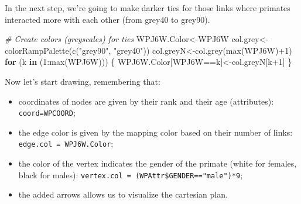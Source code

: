 \documentclass[
  notitlepage,
  onecolumn,
  openany]{book}
\newenvironment{Shaded}{\begin{snugshade}}{\end{snugshade}}
\newcommand{\CommentTok}[1]{\textcolor[rgb]{0.56,0.35,0.01}{\textit{#1}}}
\newcommand{\ControlFlowTok}[1]{\textcolor[rgb]{0.13,0.29,0.53}{\textbf{#1}}}
\newcommand{\DecValTok}[1]{\textcolor[rgb]{0.00,0.00,0.81}{#1}}
\newcommand{\FunctionTok}[1]{\textcolor[rgb]{0.00,0.00,0.00}{#1}}
\newcommand{\NormalTok}[1]{#1}
\newcommand{\OtherTok}[1]{\textcolor[rgb]{0.56,0.35,0.01}{#1}}
\newcommand{\SpecialCharTok}[1]{\textcolor[rgb]{0.00,0.00,0.00}{#1}}
\newcommand{\StringTok}[1]{\textcolor[rgb]{0.31,0.60,0.02}{#1}}
\providecommand{\tightlist}{%
  \setlength{\itemsep}{0pt}\setlength{\parskip}{0pt}}
\begin{document}
In the next step, we're going to make darker ties for those links where primates interacted more with each other (from grey40 to grey90).

\begin{Shaded}
\begin{Highlighting}[]
\CommentTok{\# Create colors (greyscales) for ties}
\NormalTok{WPJ6W.Color}\OtherTok{\textless{}{-}}\NormalTok{WPJ6W}
\NormalTok{col.grey}\OtherTok{\textless{}{-}}\FunctionTok{colorRampPalette}\NormalTok{(}\FunctionTok{c}\NormalTok{(}\StringTok{"grey90"}\NormalTok{, }\StringTok{"grey40"}\NormalTok{))}
\NormalTok{col.greyN}\OtherTok{\textless{}{-}}\FunctionTok{col.grey}\NormalTok{(}\FunctionTok{max}\NormalTok{(WPJ6W)}\SpecialCharTok{+}\DecValTok{1}\NormalTok{)}
\ControlFlowTok{for}\NormalTok{ (k }\ControlFlowTok{in}\NormalTok{ (}\DecValTok{1}\SpecialCharTok{:}\FunctionTok{max}\NormalTok{(WPJ6W)))}
\NormalTok{\{}
\NormalTok{    WPJ6W.Color[WPJ6W}\SpecialCharTok{==}\NormalTok{k]}\OtherTok{\textless{}{-}}\NormalTok{col.greyN[k}\SpecialCharTok{+}\DecValTok{1}\NormalTok{]}
\NormalTok{\}}
\end{Highlighting}
\end{Shaded}

Now let's start drawing, remembering that:

\begin{itemize}
\tightlist
\item
  coordinates of nodes are given by their rank and their age (attributes): \texttt{coord=WPCOORD};
\item
  the edge color is given by the mapping color based on their number of links: \texttt{edge.col\ =\ WPJ6W.Color};
\item
  the color of the vertex indicates the gender of the primate (white for females, black for males): \texttt{vertex.col\ =\ (WPAttr\$GENDER=="male")*9};
\item
  the added arrows allows us to visualize the cartesian plan.
\end{itemize}
\end{document}
